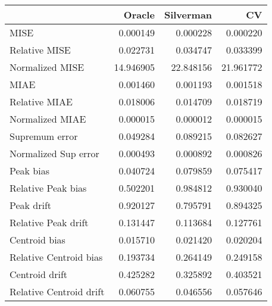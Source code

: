 \begin{tabular}{lrrr}
  \toprule
 & Oracle & Silverman & CV \\ 
  \midrule
MISE & 0.000149 & 0.000228 & 0.000220 \\ 
  Relative MISE & 0.022731 & 0.034747 & 0.033399 \\ 
  Normalized MISE & 14.946905 & 22.848156 & 21.961772 \\ 
  MIAE & 0.001460 & 0.001193 & 0.001518 \\ 
  Relative MIAE & 0.018006 & 0.014709 & 0.018719 \\ 
  Normalized MIAE & 0.000015 & 0.000012 & 0.000015 \\ 
  Supremum error & 0.049284 & 0.089215 & 0.082627 \\ 
  Normalized Sup error & 0.000493 & 0.000892 & 0.000826 \\ 
  Peak bias & 0.040724 & 0.079859 & 0.075417 \\ 
  Relative Peak bias & 0.502201 & 0.984812 & 0.930040 \\ 
  Peak drift & 0.920127 & 0.795791 & 0.894325 \\ 
  Relative Peak drift & 0.131447 & 0.113684 & 0.127761 \\ 
  Centroid bias & 0.015710 & 0.021420 & 0.020204 \\ 
  Relative Centroid bias & 0.193734 & 0.264149 & 0.249158 \\ 
  Centroid drift & 0.425282 & 0.325892 & 0.403521 \\ 
  Relative Centroid drift & 0.060755 & 0.046556 & 0.057646 \\ 
   \bottomrule
\end{tabular}
